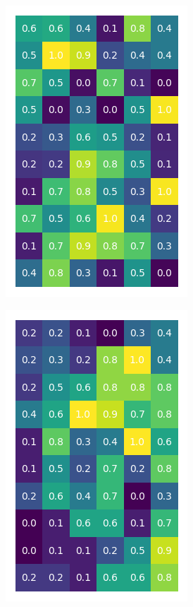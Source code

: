 \documentclass[10pt,twocolumn]{article}
\begin{document}
\begin{figure}[H]
\begin{subfigure}[t]{.15\textwidth}
\centering
\includegraphics[scale=.2]{DWGs/random-matrix-original.png}
\caption{ }
\end{subfigure}
\begin{subfigure}[t]{.15\textwidth}
\centering
\includegraphics[scale=.2]{DWGs/semi-structured-matrix-original.png}
\caption{ }
\end{subfigure}
\begin{subfigure}[t]{.15\textwidth}
\centering

\end{subfigure}
\end{figure}
\end{document}
